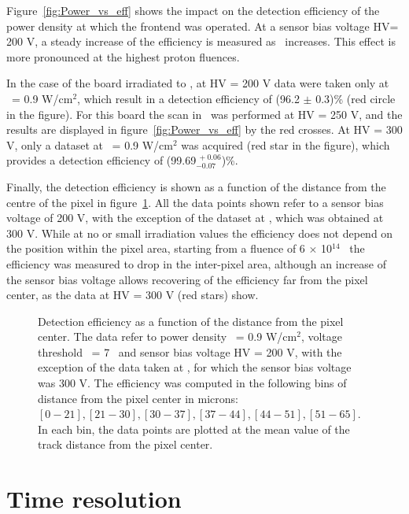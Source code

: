 		Figure~\ref{fig:Power_vs_eff} shows the impact on the detection efficiency of the power density at which the frontend was operated. 
		At a sensor bias voltage HV= 200 V, a steady increase of the efficiency is measured as \pdensity~increases. This effect is more pronounced at the highest proton fluences. 

		In the case of the board irradiated to \maxflu, at HV = 200 V data were taken only at \pdensity~= 0.9 W/cm$^2$, which result in a detection efficiency of (96.2 $\pm$ 0.3)\% (red circle in the figure).
		For this board the scan in \pdensity~was performed at HV = 250 V, and the results are displayed in figure~\ref{fig:Power_vs_eff} by the red crosses. 
		At HV = 300 V, only a dataset at \pdensity~= 0.9 W/cm$^2$ was acquired  (red star in the figure), which provides a detection efficiency of (99.69$^{~\!+0.06}_{-0.07}$)\%.

		Finally, the detection efficiency is shown as a function of the distance from the centre of the pixel in figure~\ref{fig:Eff_vs_distance}.
		All the data points shown refer to a sensor bias voltage of 200 V, with the exception of the dataset at \maxflu, which was obtained at 300 V.
		While at no or small irradiation values the efficiency does not depend on the position within the pixel area, starting from a fluence of 6 $\times$ 10$^{14}$ \flu~the efficiency was measured to drop in the inter-pixel area, although an increase of the sensor bias voltage allows recovering of the efficiency far from the pixel center, as the data at HV = 300 V (red stars) show.

		\begin{figure}[!htb]
			\centering
			\caption{\label{fig:Eff_vs_distance}Detection efficiency as a function of the distance from the pixel center. The data refer to power density \pdensity~= 0.9 W/cm$^2$, voltage threshold  \vth~= 7 \sigmav~and sensor bias voltage HV = 200 V, with the exception of the data taken at \maxflu, for which the sensor bias voltage was 300 V. The efficiency was computed in the following bins of distance from the pixel center in microns: $[0-21], [21-30], [30-37], [37-44], [44-51], [51-65]$. In each bin, the data points are plotted at the mean value of the track distance from the pixel center.}
		\end{figure}



		\section{Time resolution}\label{sec:timing}


